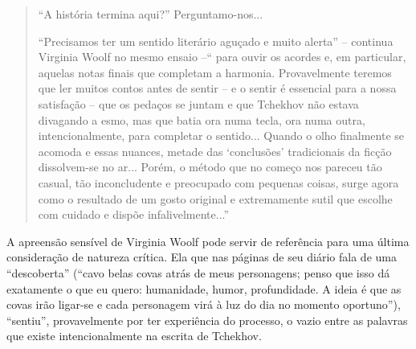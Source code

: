 \begin{quote}
``A história termina aqui?'' Perguntamo-nos...

``Precisamos ter um sentido literário aguçado e muito alerta'' --
continua Virginia Woolf no mesmo ensaio --`` para ouvir os acordes e, em
particular, aquelas notas finais que completam a harmonia. Provavelmente
teremos que ler muitos contos antes de sentir -- e o sentir é essencial
para a nossa satisfação -- que os pedaços se juntam e que Tchekhov não
estava divagando a esmo, mas que batia ora numa tecla, ora numa outra,
intencionalmente, para completar o sentido... Quando o olho finalmente
se acomoda e essas nuances, metade das `conclusões' tradicionais da
ficção dissolvem-se no ar... Porém, o método que no começo nos pareceu
tão casual, tão inconcludente e preocupado com pequenas coisas, surge
agora como o resultado de um gosto original e extremamente sutil que
escolhe com cuidado e dispõe infalivelmente...''
\end{quote}

A apreensão sensível de Virginia Woolf pode servir de referência para
uma última consideração de natureza crítica. Ela que nas páginas de seu
diário fala de uma ``descoberta'' (``cavo belas covas atrás de meus
personagens; penso que isso dá exatamente o que eu quero: humanidade,
humor, profundidade. A ideia é que as covas irão ligar-se e cada
personagem virá à luz do dia no momento oportuno''), ``sentiu'',
provavelmente por ter experiência do processo, o vazio entre as palavras
que existe intencionalmente na escrita de Tchekhov.


